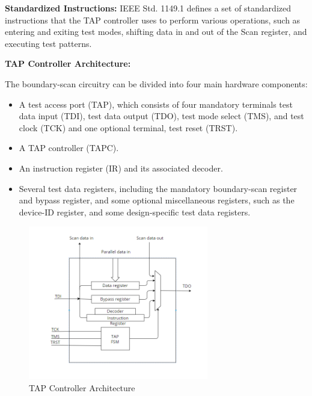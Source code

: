 \textbf{Standardized Instructions:} IEEE Std. 1149.1 defines a set of standardized instructions that the TAP controller uses to perform various operations, such as entering and exiting test modes, shifting data in and out of the Scan register, and executing test patterns.
\vspace{2mm}

\textbf{TAP Controller Architecture:}

The boundary-scan circuitry can be divided into four main hardware components: 
\vspace{1mm}

\begin{itemize}
    \item A test access port (TAP), which consists of four mandatory terminals test data input (TDI), test data output (TDO), test mode select (TMS), and test clock (TCK) and one optional terminal, test reset (TRST).
    \item A TAP controller (TAPC).
    \item An instruction register (IR) and its associated decoder.
    \item Several test data registers, including the mandatory boundary-scan register and bypass register, and some optional miscellaneous registers, such as the device-ID register, and some design-specific test data registers.
\end{itemize}

\begin{figure}[h] %
  \centering
  \setlength{\abovecaptionskip}{0pt} %
  \setlength{\belowcaptionskip}{0pt} %
  \includegraphics[width=0.7\textwidth]{Image/TAP1.png} %
  \caption{TAP Controller Architecture}
  \label{Figure 6.3 : ARM Cortex-A9}
\end{figure}

